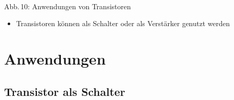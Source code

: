 \begin{frame}
\begin{minipage}{0.4\textwidth}
\begin{center}
    \end{center}
  \end{minipage}\\
  \vspace{3mm}
  {\tiny Abb.\,10: Anwendungen von Transistoren~\cite{bnetza}}
  \begin{itemize}
    \item Transistoren können als Schalter oder als Verstärker genutzt werden
  \end{itemize}
\end{frame}

\section*{Anwendungen}
\subsection*{Transistor als Schalter}
